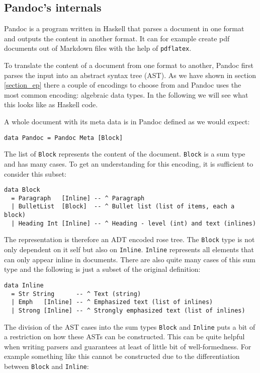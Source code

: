 \subsection{Pandoc's internals}

Pandoc is a program written in Haskell that parses a document in one format and
outputs the content in another format. It can for example create pdf documents
out of Markdown files with the help of \texttt{pdflatex}.

To translate the content of a document from one format to another, Pandoc first
parses the input into an abstract syntax tree (AST). As we have shown in section
\ref{section_ep} there a couple of encodings to choose from and Pandoc uses the
most common encoding: algebraic data types. In the following we will see what
this looks like as Haskell code.

A whole document with its meta data is in Pandoc defined as we would expect:

\begin{lstlisting}
data Pandoc = Pandoc Meta [Block]
\end{lstlisting}

The list of \texttt{Block} represents the content of the document.
\texttt{Block} is a sum type and has many cases. To get an understanding for
this encoding, it is sufficient to consider this subset:

\begin{lstlisting}
data Block
  = Paragraph   [Inline] -- ^ Paragraph
  | BulletList  [Block]  -- ^ Bullet list (list of items, each a block)
  | Heading Int [Inline] -- ^ Heading - level (int) and text (inlines)
\end{lstlisting}

The representation is therefore an ADT encoded rose tree. The \texttt{Block}
type is not only dependent on it self but also on \texttt{Inline}.
\texttt{Inline} represents all elements that can only appear inline in
documents. There are also quite many cases of this sum type and the following is
just a subset of the original definition:

\begin{lstlisting}
data Inline
  = Str String      -- ^ Text (string)
  | Emph   [Inline] -- ^ Emphasized text (list of inlines)
  | Strong [Inline] -- ^ Strongly emphasized text (list of inlines)
\end{lstlisting}

The division of the AST cases into the sum types \texttt{Block} and
\texttt{Inline} puts a bit of a restriction on how these ASTs can be
constructed. This can be quite helpful when writing parsers and guarantees at
least of little bit of well-formedness. For example something like this cannot
be constructed due to the differentiation between \texttt{Block} and
\texttt{Inline}:

